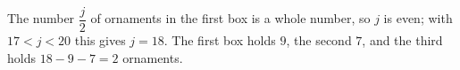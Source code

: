 The number $\dfrac{j}{2}$ of ornaments in the first box is a whole number, so $j$ is even; with $17<j<20$ this gives $j=18$. The first box holds $9$, the second $7$, and the third holds $18-9-7=\boxed{2}$ ornaments.
